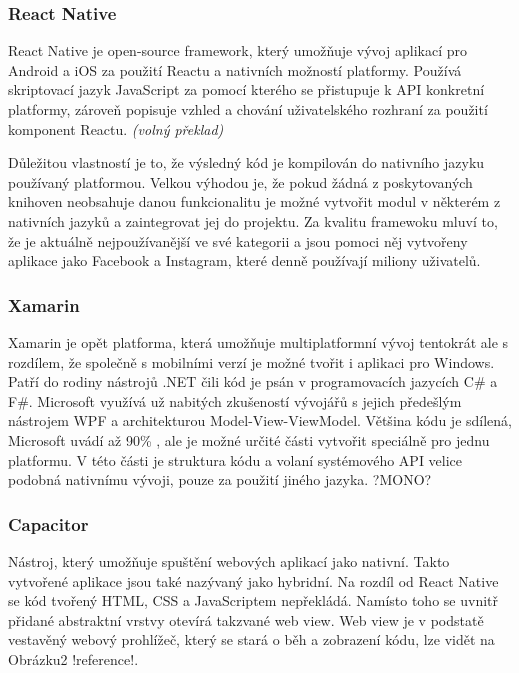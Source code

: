 \documentclass[
  biblatex,
  glossaries,
  index
]{kidiplom}
\begin{document}
\subsubsection{React Native}
React Native je open-source framework, který umožňuje vývoj aplikací pro Android a iOS za použití Reactu a nativních možností platformy. Používá skriptovací jazyk JavaScript za pomocí kterého se přistupuje k API konkretní platformy, zároveň popisuje vzhled a chování  uživatelského rozhraní za použití komponent Reactu.
\cite{3}
\textit{(volný překlad)}

Důležitou vlastností je to, že výsledný kód je kompilován do nativního jazyku používaný platformou. Velkou výhodou je, že pokud žádná z poskytovaných knihoven neobsahuje danou funkcionalitu je možné vytvořit modul v některém z nativních jazyků a zaintegrovat jej do projektu. Za kvalitu framewoku mluví to, že je aktuálně nejpoužívanější ve své kategorii a jsou pomoci něj vytvořeny aplikace jako Facebook a Instagram, které denně používají miliony uživatelů.

\subsubsection{Xamarin}
Xamarin je opět platforma, která umožňuje multiplatformní vývoj tentokrát ale s rozdílem, že společně s mobilními verzí je možné tvořit i aplikaci pro Windows. Patří do rodiny nástrojů .NET čili kód je psán v programovacích jazycích C\# a F\#. Microsoft využívá už nabitých zkušeností vývojářů s jejich předešlým nástrojem WPF a architekturou Model-View-ViewModel. Většina kódu je sdílená, Microsoft uvádí až 90\% \cite{4}, ale je možné určité části vytvořit speciálně pro jednu platformu. V této části je struktura kódu a volaní systémového API velice podobná nativnímu vývoji, pouze za použití jiného jazyka. ?MONO?

\subsubsection{Capacitor}
Nástroj, který umožňuje spuštění webových aplikací jako nativní. Takto vytvořené aplikace jsou také nazývaný jako hybridní. Na rozdíl od React Native se kód tvořený HTML, CSS a JavaScriptem nepřekládá. Namísto toho se uvnitř přidané abstraktní vrstvy otevírá takzvané web view. Web view je v podstatě vestavěný webový prohlížeč, který se stará o běh a zobrazení kódu, lze vidět na Obrázku2 !reference!.  
\end{document}
